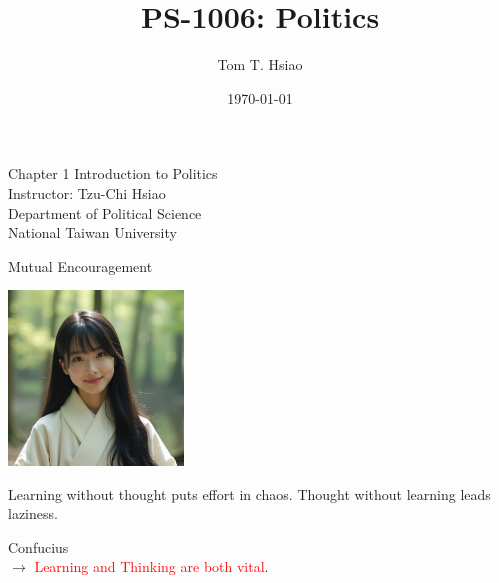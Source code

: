 \documentclass{beamer}
\title{PS-1006: Politics}
\author{Tom T. Hsiao}
\date{\today}
\begin{document}
\begin{frame}
\begin{center}
\Large{Chapter 1 Introduction to Politics} \\
\vspace{3em}
\normalsize{Instructor: Tzu-Chi Hsiao} \\
\vspace{3em}
\small{Department of Political Science} \\
\vspace{1em}
\small{National Taiwan University} \\
\end{center}
\end{frame}
\begin{frame}{Mutual Encouragement}
\begin{center}
\includegraphics[width=0.35\textwidth]{mc.png}
\end{center}
\begin{center}
Learning without thought puts effort in chaos. Thought without learning leads laziness.
\end{center}
\flushright Confucius \\
\flushleft $\rightarrow$ \textcolor{red}{Learning and Thinking are both vital}.
\end{frame}
\end{document}
